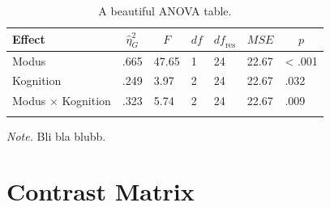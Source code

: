 \documentclass[
  doc,floatsintext]{apa6}
\newenvironment{Shaded}{\begin{snugshade}}{\end{snugshade}}
\newcommand{\DecValTok}[1]{\textcolor[rgb]{0.00,0.00,0.81}{#1}}
\newcommand{\FunctionTok}[1]{\textcolor[rgb]{0.13,0.29,0.53}{\textbf{#1}}}
\newcommand{\NormalTok}[1]{#1}
\newcommand{\OtherTok}[1]{\textcolor[rgb]{0.56,0.35,0.01}{#1}}
\newcommand{\SpecialCharTok}[1]{\textcolor[rgb]{0.81,0.36,0.00}{\textbf{#1}}}
\begin{document}
\begin{table}[tbp]

\begin{center}
\begin{threeparttable}

\caption{\label{tab:tabanova}A beautiful ANOVA table.}

\begin{tabular}{lllllll}
\toprule
Effect & \multicolumn{1}{c}{$\hat{\eta}^2_G$} & \multicolumn{1}{c}{$F$} & \multicolumn{1}{c}{$\mathit{df}$} & \multicolumn{1}{c}{$\mathit{df}_{\mathrm{res}}$} & \multicolumn{1}{c}{$\mathit{MSE}$} & \multicolumn{1}{c}{$p$}\\
\midrule
Modus & .665 & 47.65 & 1 & 24 & 22.67 & < .001\\
Kognition & .249 & 3.97 & 2 & 24 & 22.67 & .032\\
Modus $\times$ Kognition & .323 & 5.74 & 2 & 24 & 22.67 & .009\\
\bottomrule
\addlinespace
\end{tabular}

\begin{tablenotes}[para]
\normalsize{\textit{Note.} Bli bla blubb.}
\end{tablenotes}

\end{threeparttable}
\end{center}

\end{table}

\hypertarget{contrast-matrix}{%
\section{Contrast Matrix}\label{contrast-matrix}}

\begin{Shaded}
\end{Shaded}
\end{document}

